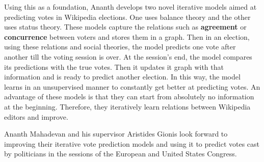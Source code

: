 \documentclass[12pt,a4paper]{article}
\begin{document}
\medskip
\noindent
Using this as a foundation, Ananth develops two novel iterative models aimed at predicting votes in Wikipedia elections.
One uses balance theory and the other uses status theory.
These models capture the relations such as \textbf{agreement} or \textbf{concurrence} between voters and stores them in a graph.
Then in an election, using these relations and social theories, the model predicts one vote after another till the voting session is over.
At the session's end, the model compares its predictions with the true votes.
Then it updates it graph with that information and is ready to predict another election.
In this way, the model learns in an unsupervised manner to constantly get better at predicting votes.
An advantage of these models is that they can start from absolutely no information at the beginning.
Therefore, they iteratively learn relations between Wikipedia editors and improve. 

\medskip
\noindent
Ananth Mahadevan and his supervisor Aristides Gionis look forward to improving their iterative vote prediction models and using it to predict votes cast by politicians in the sessions of the European and United States Congress.
\end{document}
